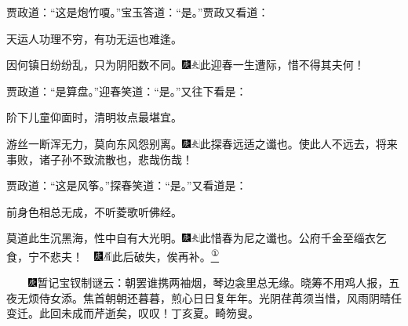 贾政道：``这是炮竹嗄。''宝玉答道：``是。''贾政又看道：

天运人功理不穷，有功无运也难逢。

因何镇日纷纷乱，只为阴阳数不同。{\includegraphics[width=3mm]{../Images/00004}\includegraphics[width=3mm]{../Images/00012}\footnotesize \kaishu 此迎春一生遭际，惜不得其夫何！}

贾政道：``是算盘。''迎春笑道：``是。''又往下看是：

阶下儿童仰面时，清明妆点最堪宜。

游丝一断浑无力，莫向东风怨别离。{\includegraphics[width=3mm]{../Images/00004}\includegraphics[width=3mm]{../Images/00012}\footnotesize \kaishu 此探春远适之谶也。使此人不远去，将来事败，诸子孙不致流散也，悲哉伤哉！}

贾政道：``这是风筝。''探春笑道：``是。''又看道是：

前身色相总无成，不听菱歌听佛经。

莫道此生沉黑海，性中自有大光明。{\includegraphics[width=3mm]{../Images/00004}\includegraphics[width=3mm]{../Images/00012}\footnotesize \kaishu 此惜春为尼之谶也。公府千金至缁衣乞食，宁不悲夫！　{\includegraphics[width=3mm]{../Images/00004}\includegraphics[width=3mm]{../Images/00010}\footnotesize \kaishu 此后破失，俟再补。}}\href{../Text/part0026_split_000.html\#lnkback_1_a}{\textsuperscript{①}}

{　　\includegraphics[width=3mm]{../Images/00004}暂记宝钗制谜云：朝罢谁携两袖烟，琴边衾里总无缘。晓筹不用鸡人报，五夜无烦侍女添。焦首朝朝还暮暮，煎心日日复年年。光阴荏苒须当惜，风雨阴晴任变迁。此回未成而芹逝矣，叹叹！丁亥夏。畸笏叟。}

